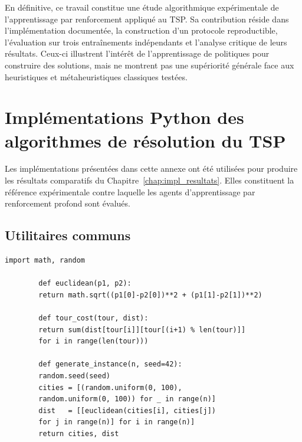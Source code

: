 \documentclass[12pt, a4paper, twoside, openright]{book}
\renewcommand{\thechapter}      {\Roman{chapter}}
\renewcommand{\thetable}        {\arabic{chapter}.\arabic{table}}
\begin{document}
En définitive, ce travail constitue une étude algorithmique expérimentale de
l'apprentissage par renforcement appliqué au TSP. Sa contribution réside dans
l'implémentation documentée, la construction d'un protocole reproductible,
l'évaluation sur trois entraînements indépendants et l'analyse critique de
leurs résultats. Ceux-ci illustrent l'intérêt de l'apprentissage de politiques
pour construire des solutions, mais ne montrent pas une supériorité générale
face aux heuristiques et métaheuristiques classiques testées.

	\appendix
\renewcommand{\thetable}{\thechapter.\arabic{table}}
	\chapter{Implémentations Python des algorithmes de résolution du TSP}
	\label{ann:implementations}
	
	Les implémentations présentées dans cette annexe ont été utilisées pour
	produire les résultats comparatifs du Chapitre~\ref{chap:impl_resultats}.
	Elles constituent la référence expérimentale contre laquelle les agents
	d'apprentissage par renforcement profond sont évalués.
	
	\section{Utilitaires communs}
	\label{ann:utils}
	
	\begin{lstlisting}[caption={Génération d'instances euclidiennes et calcul du coût d'une tournée.}, label={lst:utils}]
		import math, random
		
		def euclidean(p1, p2):
		return math.sqrt((p1[0]-p2[0])**2 + (p1[1]-p2[1])**2)
		
		def tour_cost(tour, dist):
		return sum(dist[tour[i]][tour[(i+1) % len(tour)]]
		for i in range(len(tour)))
		
		def generate_instance(n, seed=42):
		random.seed(seed)
		cities = [(random.uniform(0, 100),
		random.uniform(0, 100)) for _ in range(n)]
		dist   = [[euclidean(cities[i], cities[j])
		for j in range(n)] for i in range(n)]
		return cities, dist
	\end{lstlisting}
	
\end{document}
